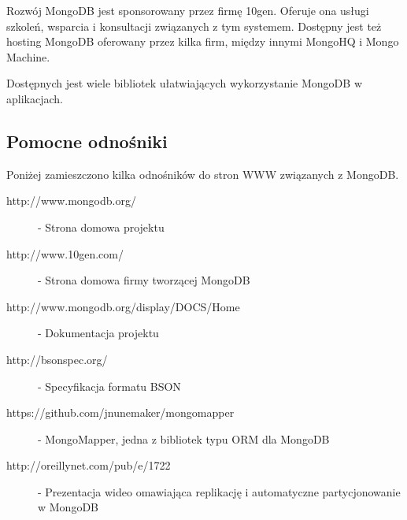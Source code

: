 Rozwój MongoDB jest sponsorowany przez firmę 10gen.
Oferuje ona usługi szkoleń, wsparcia i konsultacji związanych z tym systemem.
Dostępny jest też hosting MongoDB oferowany przez kilka firm, między innymi MongoHQ i Mongo Machine.

Dostępnych jest wiele bibliotek ułatwiających wykorzystanie MongoDB w aplikacjach.

\subsection*{Pomocne odnośniki}

Poniżej zamieszczono kilka odnośników do stron WWW związanych z MongoDB.

\begin{description}
 \item [http://www.mongodb.org/] - Strona domowa projektu
 \item [http://www.10gen.com/] - Strona domowa firmy tworzącej MongoDB
 \item [http://www.mongodb.org/display/DOCS/Home] - Dokumentacja projektu 
 \item [http://bsonspec.org/] - Specyfikacja formatu BSON
 \item [https://github.com/jnunemaker/mongomapper] - MongoMapper, jedna z bibliotek typu ORM dla MongoDB
 \item [http://oreillynet.com/pub/e/1722] - Prezentacja wideo omawiająca replikację i automatyczne partycjonowanie w MongoDB
\end{description}
